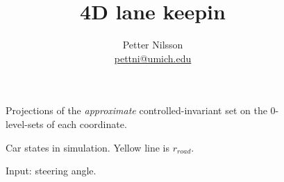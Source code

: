 \documentclass[letterpaper, 12pt]{article}
\title{4D lane keepin}
\author{Petter Nilsson \\ \href{mailto:pettni@umich.edu}{pettni@umich.edu}}
\newlength{\figurewidth}
\newlength{\figureheight}
\begin{document}
\begin{figure}

\setlength{} 
\setlength{} 
		
\begin{subfigure}{0.45\columnwidth}
	
\end{subfigure}
\begin{subfigure}{0.45\columnwidth}
	
\end{subfigure}

\begin{subfigure}{0.45\columnwidth}
	
\end{subfigure}
\begin{subfigure}{0.45\columnwidth}
	
\end{subfigure}

\caption{Projections of the \emph{approximate} controlled-invariant set on the 0-level-sets of each coordinate.}
\end{figure}

\setlength{} 
\setlength{} 

\begin{figure}[ht]
	\begin{center}
		
	\end{center}
	\caption{Car states in simulation. Yellow line is $r_{road}$.}
	\label{fig:invariant}
\end{figure}
\setlength{} 
\setlength{} 

\begin{figure}[ht]
	\begin{center}
		
	\end{center}
	\caption{Input: steering angle.}
	\label{fig:df}
\end{figure}
\end{document}
